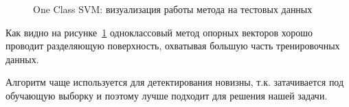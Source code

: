 \documentclass[12pt]{article}
\begin{document}
    \begin{figure}[h!]
        \centering
        \caption{One Class SVM: визуализация работы метода на тестовых данных}
        \label{sec:Research:Model:Visualization:fig:OneClassSVM}
    \end{figure}

    \par Как видно на рисунке~\ref{sec:Research:Model:Visualization:fig:OneClassSVM} одноклассовый метод опорных векторов хорошо проводит разделяющую поверхность, охватывая большую часть тренировочных данных.

    \par Алгоритм чаще используется для детектирования новизны, т.к. затачивается под обучающую выборку и поэтому лучше подходит для решения нашей задачи.
\end{document}
